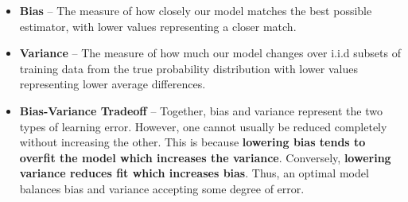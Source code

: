 \begin{itemize}
    \item[] {\bf Bias} -- The measure of how closely our model matches the best possible estimator, with lower values representing a closer match.
    \item[] {\bf Variance} -- The measure of how much our model changes over i.i.d subsets of training data from the true probability distribution with lower values representing lower average differences.
    \item[] {\bf Bias-Variance Tradeoff} -- Together, bias and variance represent the two types of learning error. However, one cannot usually be reduced completely without increasing the other. This is because {\bf lowering bias tends to overfit the model which increases the variance}. Conversely, {\bf lowering variance reduces fit which increases bias}. Thus, an optimal model balances bias and variance accepting some degree of error.
\end{itemize}
